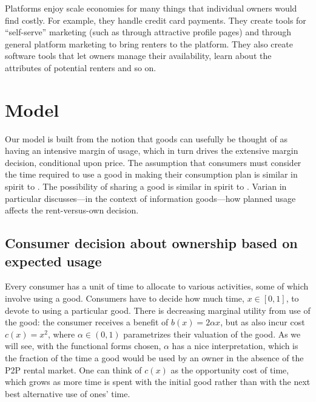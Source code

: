\documentclass[11pt]{article}
\begin{document}
Platforms enjoy scale economies for many things that individual owners would find costly. 
For example, they handle credit card payments. 
They create tools for ``self-serve'' marketing (such as through attractive profile pages) and through general platform marketing to bring renters to the platform. 
They also create software tools that let owners manage their availability, learn about the attributes of potential renters and so on. 


\section{Model} \label{sec:model}

Our model is built from the notion that goods can usefully be thought of as having an intensive margin of usage, which in turn drives the extensive margin decision, conditional upon price. 
The assumption that consumers must consider the time required to use a good in making their consumption plan is similar in spirit to \cite{becker1965theory}.
The possibility of sharing a good is similar in spirit to \cite{varian2000}.
Varian in particular discusses---in the context of information goods---how planned usage affects the rent-versus-own decision. 

\subsection{Consumer decision about ownership based on expected usage}  
Every consumer has a unit of time to allocate to various activities, some of which involve using a good.  
Consumers have to decide how much time, $x \in [0,1]$, to devote to using a particular good. 
There is decreasing marginal utility from use of the good: 
the consumer receives a benefit of $b(x) = 2\alpha x$, but as also incur cost $c(x) = x^2$,  
where $\alpha \in (0,1)$ parametrizes their valuation of the good.
As we will see, with the functional forms chosen, $\alpha$ has a nice interpretation, which is the fraction of the time a good would be used by an owner in the absence of the P2P rental market. 
One can think of $c(x)$ as the opportunity cost of time, which grows as more time is spent with the initial good rather than with the next best alternative use of ones' time. 
\end{document}

